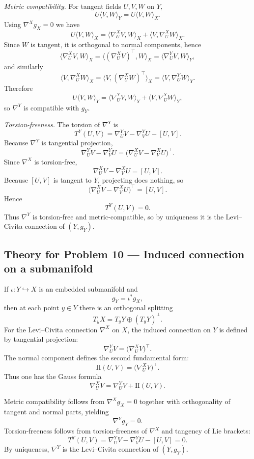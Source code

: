 \documentclass[12pt,a4paper]{article}
\theoremstyle{plain}
\theoremstyle{definition}      %
\begin{document}
\textit{Metric compatibility.}
For tangent fields $U,V,W$ on $Y$,
\[
U\langle V,W\rangle_Y
=
U\langle V,W\rangle_X.
\]
Using $\nabla^X g_X=0$ we have
\[
U\langle V,W\rangle_X
=
\langle \nabla^X_U V, W\rangle_X
+
\langle V,\nabla^X_U W\rangle_X.
\]
Since $W$ is tangent, it is orthogonal to normal components, hence
\[
\langle \nabla^X_U V, W\rangle_X
=
\langle (\nabla^X_U V)^\top, W\rangle_X
=
\langle \nabla^Y_U V, W\rangle_Y,
\]
and similarly
\[
\langle V,\nabla^X_U W\rangle_X
=
\langle V,(\nabla^X_U W)^\top\rangle_X
=
\langle V,\nabla^Y_U W\rangle_Y.
\]
Therefore
\[
U\langle V,W\rangle_Y
=
\langle \nabla^Y_U V, W\rangle_Y
+
\langle V,\nabla^Y_U W\rangle_Y,
\]
so $\nabla^Y$ is compatible with $g_Y$.

\textit{Torsion-freeness.}
The torsion of $\nabla^Y$ is
\[
T^Y(U,V)=\nabla^Y_U V-\nabla^Y_V U-[U,V].
\]
Because $\nabla^Y$ is tangential projection,
\[
\nabla^Y_U V-\nabla^Y_V U
=
\bigl(\nabla^X_U V-\nabla^X_V U\bigr)^\top.
\]
Since $\nabla^X$ is torsion-free,
\[
\nabla^X_U V-\nabla^X_V U=[U,V].
\]
Because $[U,V]$ is tangent to $Y$, projecting does nothing, so
\[
\bigl(\nabla^X_U V-\nabla^X_V U\bigr)^\top
=
[U,V].
\]
Hence
\[
T^Y(U,V)=0.
\]
Thus $\nabla^Y$ is torsion-free and metric-compatible, so by uniqueness it is the Levi--Civita connection of $(Y,g_Y)$.




\subsection*{Theory for Problem 10 — Induced connection on a submanifold}

If $\iota:Y\hookrightarrow X$ is an embedded submanifold and
\[
g_Y=\iota^*g_X,
\]
then at each point $y\in Y$ there is an orthogonal splitting
\[
T_yX=T_yY\oplus (T_yY)^\perp.
\]
For the Levi--Civita connection $\nabla^X$ on $X$, the induced connection on $Y$ is defined by tangential projection:
\[
\nabla^Y_U V=\bigl(\nabla^X_U V\bigr)^\top.
\]
The normal component defines the second fundamental form:
\[
\mathrm{II}(U,V)=\bigl(\nabla^X_U V\bigr)^\perp.
\]
Thus one has the Gauss formula
\[
\nabla^X_U V=\nabla^Y_U V+\mathrm{II}(U,V).
\]

Metric compatibility follows from $\nabla^X g_X=0$ together with orthogonality of tangent and normal parts, yielding
\[
\nabla^Y g_Y=0.
\]
Torsion-freeness follows from torsion-freeness of $\nabla^X$ and tangency of Lie brackets:
\[
T^Y(U,V)=\nabla^Y_U V-\nabla^Y_V U-[U,V]=0.
\]
By uniqueness, $\nabla^Y$ is the Levi--Civita connection of $(Y,g_Y)$.
\end{document}

